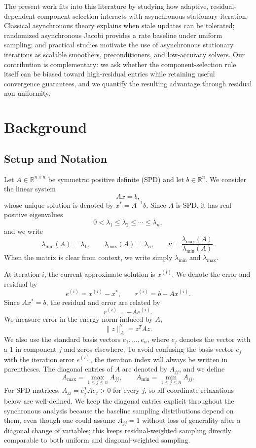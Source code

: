 \documentclass[pdflatex,sn-mathphys-num]{sn-jnl}%
\newcommand{\R}{\mathbb{R}}
\newcommand{\Anorm}[1]{\|#1\|_{A}}
\newcommand{\lmin}{\lambda_{\min}}
\newcommand{\lmax}{\lambda_{\max}}
\theoremstyle{thmstyleone}%
\theoremstyle{thmstyletwo}%
\theoremstyle{thmstylethree}%
\begin{document}
The present work fits into this literature by studying how adaptive,
residual-dependent component selection interacts with asynchronous stationary
iteration.  Classical asynchronous theory explains when stale updates can be
tolerated; randomized asynchronous Jacobi provides a rate baseline under uniform
sampling; and practical studies motivate the use of asynchronous stationary
iterations as scalable smoothers, preconditioners, and low-accuracy solvers.  Our
contribution is complementary: we ask whether the component-selection rule itself
can be biased toward high-residual entries while retaining useful convergence
guarantees, and we quantify the resulting advantage through residual
non-uniformity.


\section{Background}
\label{sec:background}

\subsection{Setup and Notation}

Let $A \in \R^{n \times n}$ be symmetric positive definite (SPD) and let
$b \in \R^n$.  We consider the linear system
\[
    Ax = b,
\]
whose unique solution is denoted by $x^* = A^{-1}b$.  Since $A$ is SPD, it has
real positive eigenvalues
\[
    0 < \lambda_1 \leq \lambda_2 \leq \cdots \leq \lambda_n,
\]
and we write
\[
    \lmin(A) = \lambda_1, \qquad
    \lmax(A) = \lambda_n, \qquad
    \kappa = \frac{\lmax(A)}{\lmin(A)}.
\]
When the matrix is clear from context, we write simply $\lmin$ and $\lmax$.

At iteration $i$, the current approximate solution is $x^{(i)}$.  We denote the
error and residual by
\[
    e^{(i)} = x^{(i)} - x^*, \qquad
    r^{(i)} = b - A x^{(i)}.
\]
Since $Ax^*=b$, the residual and error are related by
\[
    r^{(i)} = -A e^{(i)}.
\]
We measure error in the energy norm induced by $A$,
\[
    \Anorm{z}^2 = z^T A z.
\]
We also use the standard basis vectors $e_1,\ldots,e_n$, where $e_j$ denotes
the vector with a $1$ in component $j$ and zeros elsewhere.  To avoid confusing
the basis vector $e_j$ with the iteration error $e^{(i)}$, the iteration index
will always be written in parentheses.  The diagonal entries of $A$ are denoted
by $A_{jj}$, and we define
\[
    A_{\max} = \max_{1 \leq j \leq n} A_{jj}, \qquad
    A_{\min} = \min_{1 \leq j \leq n} A_{jj}.
\]
For SPD matrices, $A_{jj} = e_j^T A e_j > 0$ for every $j$, so all coordinate
relaxations below are well-defined. We keep the diagonal entries explicit
throughout the synchronous analysis because the baseline sampling
distributions depend on them, even though one could assume $A_{jj} = 1$
without loss of generality after a diagonal change of variables; this
keeps residual-weighted sampling directly comparable to both uniform and
diagonal-weighted sampling.
\end{document}
